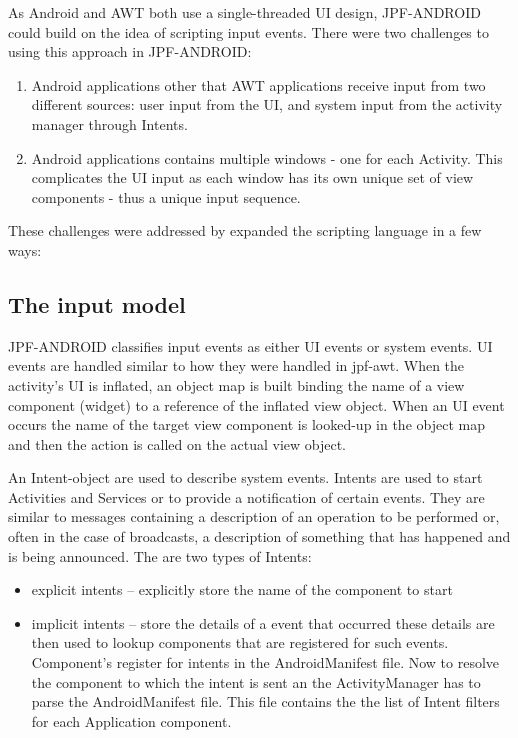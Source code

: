 \documentclass{acm_proc_article-sp}
\begin{document}
As Android and AWT both use a single-threaded UI design, JPF-ANDROID could build on the idea of scripting input events. There were two
challenges to using this approach in JPF-ANDROID:
\begin{enumerate}
 \item Android applications other that AWT applications receive input from two different
sources: user input from the UI, and system input from the activity manager through Intents. 
 \item Android applications contains multiple windows - one for each Activity. This complicates the UI input as each
window has its own unique set of view components - thus a unique input sequence.
\end{enumerate}
These challenges were addressed by expanded the scripting language in a few ways:

\subsection{The input model}
JPF-ANDROID classifies input events as either UI events or system events. UI events are handled similar to
how they were handled in jpf-awt. When the activity's UI is inflated, an object map is built binding the name of a view component (widget)
to a reference of the inflated view object. When an UI event occurs the name of the target view component is looked-up in the object map
and then the action is called on the actual view object. 

An Intent-object are used to describe system events. Intents are used to start Activities
and Services or to provide a notification of certain events. They are similar to messages containing a description of an operation to be
performed or, often in the case of broadcasts, a description of something that has happened and is being announced. The are two types of
Intents:
\begin{itemize}
 \item explicit intents -- explicitly store the name of the component to start
 \item implicit intents -- store the details of a event that occurred these details are then used to lookup components that are registered
for such events. Component's register for intents in the AndroidManifest file. Now to resolve the component to which the intent is sent an
the ActivityManager has to parse the AndroidManifest file. This file contains the the list of Intent filters for each
Application component. 
\end{itemize}
\end{document}
